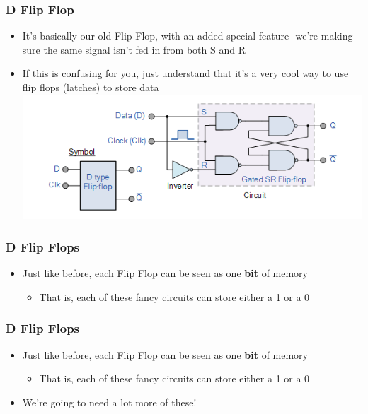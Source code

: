 \documentclass{beamer}
\begin{document}
        \begin{frame}
        		\frametitle{D Flip Flop}
        		\begin{itemize}
        			\item It's basically our old Flip Flop, with an added special feature- we're making sure the same signal isn't fed in from both S and R
        			\item If this is confusing for you, just understand that it's a very cool way to use flip flops (latches) to store data
        			\includegraphics[scale=0.5]{dflipflop} 
        		\end{itemize}
        \end{frame}
        
        \begin{frame}
        		\frametitle{D Flip Flops}
        		\begin{itemize}
        			\item Just like before, each Flip Flop can be seen as one \textbf{bit} of memory
        			\begin{itemize}
        				\item That is, each of these fancy circuits can store either a 1 or a 0
        			\end{itemize}
        		\end{itemize}
        \end{frame}
        
        \begin{frame}
        		\frametitle{D Flip Flops}
        		\begin{itemize}
        			\item Just like before, each Flip Flop can be seen as one \textbf{bit} of memory
        			\begin{itemize}
        				\item That is, each of these fancy circuits can store either a 1 or a 0
        			\end{itemize}
        			\item We're going to need a lot more of these!
        		\end{itemize}
        \end{frame}
        
\end{document}
